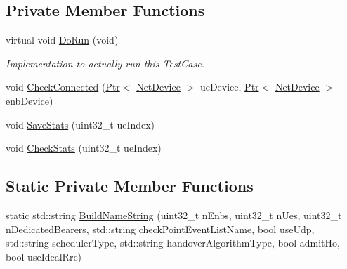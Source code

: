 \subsection*{Private Member Functions}
\begin{DoxyCompactItemize}
\item 
virtual void \hyperlink{classLteX2HandoverMeasuresTestCase_a6aefe1e71df347688687fb5d8dd54104}{Do\+Run} (void)
\begin{DoxyCompactList}\small\item\em Implementation to actually run this Test\+Case. \end{DoxyCompactList}\item 
void \hyperlink{classLteX2HandoverMeasuresTestCase_afaab3497c199b4440d286d0cb19996f3}{Check\+Connected} (\hyperlink{classns3_1_1Ptr}{Ptr}$<$ \hyperlink{classns3_1_1NetDevice}{Net\+Device} $>$ ue\+Device, \hyperlink{classns3_1_1Ptr}{Ptr}$<$ \hyperlink{classns3_1_1NetDevice}{Net\+Device} $>$ enb\+Device)
\item 
void \hyperlink{classLteX2HandoverMeasuresTestCase_abac5d644fc33677767c1d0b135c12fcc}{Save\+Stats} (uint32\+\_\+t ue\+Index)
\item 
void \hyperlink{classLteX2HandoverMeasuresTestCase_a6894b43af877258dc079c609e36ebb60}{Check\+Stats} (uint32\+\_\+t ue\+Index)
\end{DoxyCompactItemize}
\subsection*{Static Private Member Functions}
\begin{DoxyCompactItemize}
\item 
static std\+::string \hyperlink{classLteX2HandoverMeasuresTestCase_a86ce1c66fc2dd34cfc3a5cac8b74eca1}{Build\+Name\+String} (uint32\+\_\+t n\+Enbs, uint32\+\_\+t n\+Ues, uint32\+\_\+t n\+Dedicated\+Bearers, std\+::string check\+Point\+Event\+List\+Name, bool use\+Udp, std\+::string scheduler\+Type, std\+::string handover\+Algorithm\+Type, bool admit\+Ho, bool use\+Ideal\+Rrc)
\end{DoxyCompactItemize}
